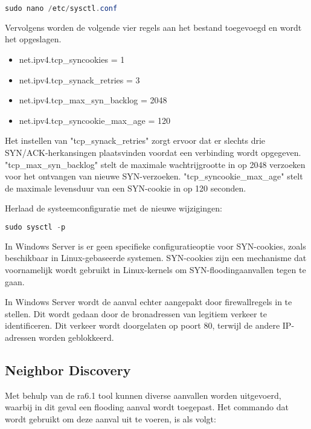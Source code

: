 \begin{lstlisting}[language=PowerShell,style=PowerShellStyle]
    sudo nano /etc/sysctl.conf
\end{lstlisting}
Vervolgens worden de volgende vier regels aan het bestand toegevoegd en wordt het opgeslagen.
\begin{itemize}
     
    \item  net.ipv4.tcp\_syncookies = 1
    \item  net.ipv4.tcp\_synack\_retries = 3
    \item  net.ipv4.tcp\_max\_syn\_backlog = 2048
    \item  net.ipv4.tcp\_syncookie\_max\_age = 120
    
\end{itemize}


Het instellen van "tcp\_synack\_retries" zorgt ervoor dat er slechts drie \newline SYN/ACK-herkansingen plaatsvinden voordat een verbinding wordt opgegeven. \newline "tcp\_max\_syn\_backlog" stelt de maximale wachtrijgrootte in op 2048 verzoeken voor het ontvangen van nieuwe SYN-verzoeken. "tcp\_syncookie\_max\_age" stelt de maximale levensduur van een SYN-cookie in op 120 seconden.

Herlaad de systeemconfiguratie met de nieuwe wijzigingen:
\begin{lstlisting}[language=PowerShell,style=PowerShellStyle]
    sudo sysctl -p
\end{lstlisting}

In Windows Server is er geen specifieke configuratieoptie voor SYN-cookies, zoals beschikbaar in Linux-gebaseerde systemen. SYN-cookies zijn een mechanisme dat voornamelijk wordt gebruikt in Linux-kernels om SYN-floodingaanvallen tegen te gaan.
\newline

In Windows Server wordt de aanval echter aangepakt door firewallregels in te stellen. Dit wordt gedaan door de bronadressen van legitiem verkeer te identificeren. Dit verkeer wordt doorgelaten op poort 80, terwijl de andere IP-adressen worden geblokkeerd.

\subsection{Neighbor Discovery}

Met behulp van de ra6.1 tool kunnen diverse aanvallen worden uitgevoerd, waarbij in dit geval een flooding aanval wordt toegepast. Het commando dat wordt gebruikt om deze aanval uit te voeren, is als volgt:

